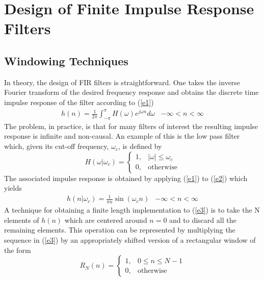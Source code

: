\chapter[FIR Filters]{Design of Finite Impulse Response Filters}
\label{fir}
\section{Windowing Techniques} 
\label{s1}

In theory,  the design of FIR filters is straightforward.
One takes the inverse Fourier transform of the desired frequency response
and obtains the discrete time impulse response of the
filter according to (\ref{e1})
%
\begin{equation}
\begin{array}{cc}
h(n)=\displaystyle{\frac{1}{2\pi}\int_{-\pi}^{\pi}
H(\omega)e^{j\omega n}d\omega} 
&  -\infty<n<\infty
\end{array}
\label{e1}
\end{equation}
%
The problem, in practice, is that for many filters of interest
the resulting impulse response is infinite and non-causal.
An example of this is the low pass filter which, given its cut-off
frequency, $\omega_c$,  is defined by
%
\begin{equation}
H(\omega|\omega_c)=\left\{ \begin{array}{ll}
                     1, & \mbox{$|\omega|\leq\omega_c$}\\
                     0, & \mbox{otherwise}
                \end{array}
       \right.
\label{e2}
\end{equation}
%
The associated impulse response is obtained by applying (\ref{e1}) to 
(\ref{e2})
which yields
%
\begin{equation}
\begin{array}{cc}
h(n|\omega_c)={\displaystyle{\frac{1}{\pi n}\sin(\omega_cn)}} &  
-\infty<n<\infty
\end{array}
\label{e3}
\end{equation}
%
A technique for obtaining a finite length
implementation to (\ref{e3}) is to take the N elements of
$h(n)$ which are centered around $n=0$ and to discard 
all the remaining elements.  This operation can
be represented by multiplying the sequence in (\ref{e3}) by an 
appropriately shifted version of a rectangular window of the form
%
\begin{equation}
R_N(n)=\left\{ \begin{array}{ll}
                     1, & \mbox{$0 \leq n \leq N-1$}\\
                     0, & \mbox{otherwise}
                \end{array}
       \right.
\label{e4}
\end{equation}
%

